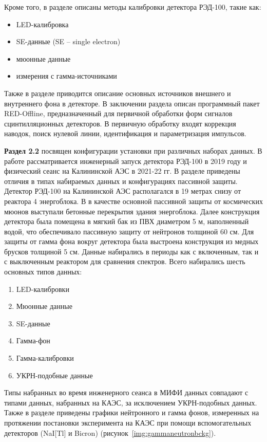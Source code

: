 Кроме того, в разделе описаны методы калибровки детектора РЭД-100, такие как:
\begin{itemize}
    \item LED-калибровка
    \item SE-данные (SE -- single electron)
    \item мюонные данные
    \item измерения с гамма-источниками
\end{itemize}
Также в разделе приводится описание основных источников внешнего и внутреннего фона в детекторе. В заключении раздела описан программный пакет RED-Offline, предназначенный для первичной обработки форм сигналов сцинтилляционных детекторов. В первичную обработку входят коррекция наводок, поиск нулевой линии, идентификация и параметризация импульсов. 

\textbf{Раздел 2.2} посвящен конфигурации установки при различных наборах данных. В работе рассматривается инженерный запуск детектора РЭД-100 в 2019 году и физический сеанс на Калининской АЭС в 2021-22 гг. В разделе приведены отличия в типах набираемых данных и конфигурациях пассивной защиты. 
Детектор РЭД-100 на Калининской АЭС располагался в 19 метрах снизу от реактора 4 энергоблока. В в качестве основной пассивной защиты от космических мюонов выступали бетонные перекрытия здания энергоблока. Далее конструкция детектора была помещена в мягкий бак из ПВХ диаметром 5 м, наполненный водой, что обеспечивало пассивную защиту от нейтронов толщиной 60 см. Для защиты от гамма фона вокруг детектора была выстроена конструкция из медных брусков толщиной 5 см. Данные набирались в периоды как с включенным, так и с выключенным реактором для сравнения спектров. 
Всего набирались шесть основных типов данных:
 \begin{enumerate}
     \item LED-калибровки
     \item Мюонные данные
     \item SE-данные
     \item Гамма-фон
     \item Гамма-калибровки
     \item УКРН-подобные данные
 \end{enumerate}
 Типы набранных во время инженерного сеанса в МИФИ данных совпадают с типами данных, набранных на КАЭС, за исключением УКРН-подобных данных. 
 Также в разделе приведены графики нейтронного и гамма фонов, измеренных на протяжении постановки эксперимента на КАЭС при помощи вспомогательных детекторов (NaI[Tl] и Bicron) (рисунок~\ref{img:gammaneutronbckg}).

